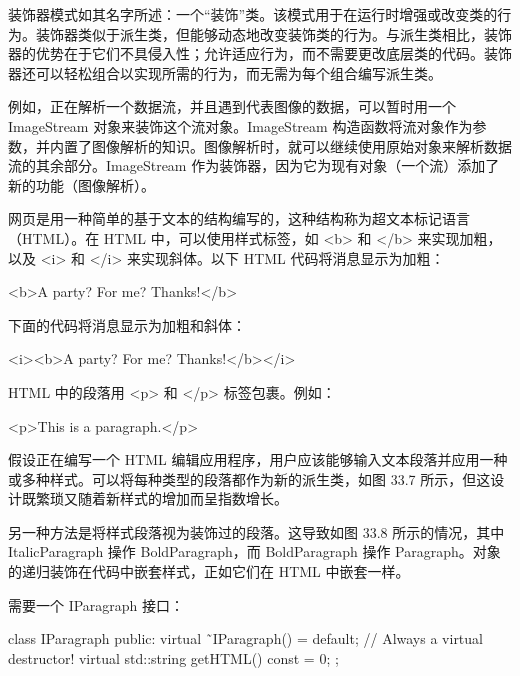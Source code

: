 
装饰器模式如其名字所述：一个“装饰”类。该模式用于在运行时增强或改变类的行为。装饰器类似于派生类，但能够动态地改变装饰类的行为。与派生类相比，装饰器的优势在于它们不具侵入性；允许适应行为，而不需要更改底层类的代码。装饰器还可以轻松组合以实现所需的行为，而无需为每个组合编写派生类。

例如，正在解析一个数据流，并且遇到代表图像的数据，可以暂时用一个 ImageStream 对象来装饰这个流对象。ImageStream 构造函数将流对象作为参数，并内置了图像解析的知识。图像解析时，就可以继续使用原始对象来解析数据流的其余部分。ImageStream 作为装饰器，因为它为现有对象（一个流）添加了新的功能（图像解析）。


网页是用一种简单的基于文本的结构编写的，这种结构称为超文本标记语言（HTML）。在 HTML 中，可以使用样式标签，如 <b> 和 </b> 来实现加粗，以及 <i> 和 </i> 来实现斜体。以下 HTML 代码将消息显示为加粗：

\begin{shell}
<b>A party? For me? Thanks!</b>
\end{shell}

下面的代码将消息显示为加粗和斜体：

\begin{shell}
<i><b>A party? For me? Thanks!</b></i>
\end{shell}

HTML 中的段落用 <p> 和 </p> 标签包裹。例如：

\begin{shell}
<p>This is a paragraph.</p>
\end{shell}

假设正在编写一个 HTML 编辑应用程序，用户应该能够输入文本段落并应用一种或多种样式。可以将每种类型的段落都作为新的派生类，如图 33.7 所示，但这设计既繁琐又随着新样式的增加而呈指数增长。


另一种方法是将样式段落视为装饰过的段落。这导致如图 33.8 所示的情况，其中 ItalicParagraph 操作 BoldParagraph，而 BoldParagraph 操作 Paragraph。对象的递归装饰在代码中嵌套样式，正如它们在 HTML 中嵌套一样。



需要一个 IParagraph 接口：

\begin{cpp}
class IParagraph
{
    public:
        virtual ˜IParagraph() = default; // Always a virtual destructor!
        virtual std::string getHTML() const = 0;
};
\end{cpp}

